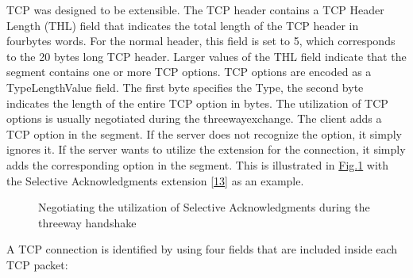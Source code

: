 \documentclass[letterpaper,10pt,english]{sphinxmanual}
\begin{document}
TCP was designed to be extensible. The TCP header contains a TCP Header Length (THL) field that indicates the total length of the TCP header in four\sphinxhyphen{}bytes words. For the normal header, this field is set to 5, which corresponds to the 20 bytes long TCP header. Larger values of the THL field indicate that the segment contains one or more TCP options. TCP options are encoded as a Type\sphinxhyphen{}Length\sphinxhyphen{}Value field. The first byte specifies the Type, the second byte indicates the length of the entire TCP option in bytes. The utilization of TCP options is usually negotiated during the three\sphinxhyphen{}way\sphinxhyphen{}exchange. The client adds a TCP option in the  segment. If the server does not recognize the option, it simply ignores it. If the server wants to utilize the extension for the connection, it simply adds the corresponding option in the  segment. This is illustrated in \hyperref[\detokenize{tcp:fig-tcp-handshake-sack}]{Fig.\@ \ref{\detokenize{tcp:fig-tcp-handshake-sack}}} with the Selective Acknowledgments extension {[}\hyperlink{cite.biblio:id1948}{13}{]} as an example.
\begin{figure}[htbp]\centering\capstart{}\caption{Negotiating the utilization of Selective Acknowledgments during the three\sphinxhyphen{}way handshake}\label{\detokenize{tcp:id6}}\label{\detokenize{tcp:fig-tcp-handshake-sack}}\end{figure}
\sphinxAtStartPar
A TCP connection is identified by using four fields that are included inside each TCP packet:
\end{document}
